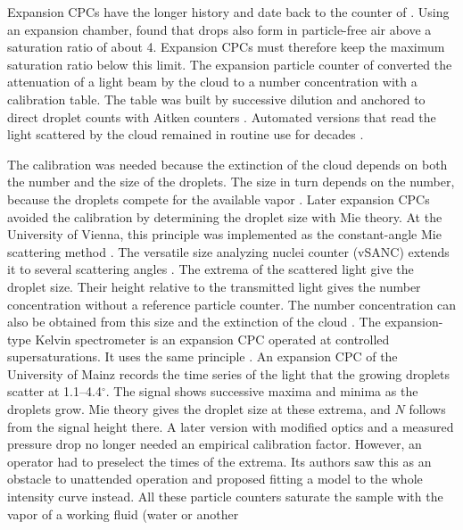 \documentclass[preprint,review,12pt,authoryear]{elsarticle}
\begin{document}
Expansion CPCs have the longer history and date back to the counter of \citet{aitken1889number}.
Using an expansion chamber, \citet{wilson1897condensation} found that drops also form in particle-free
air above a saturation ratio of about 4. Expansion CPCs must therefore keep the
maximum saturation ratio below this limit.
The expansion particle counter of \citet{nolan1946calibration} converted the attenuation of a light beam by
the cloud to a number concentration with a calibration table.
The table was built by successive dilution and anchored to direct droplet counts with Aitken counters
\citep{nolan1946calibration,pollak1959calibration}.
Automated versions that read the light scattered by the cloud remained in routine use for decades
\citep{skala1963new,mcmurry2000history}.

The calibration was needed because the extinction of the cloud depends on both the number and the size of
the droplets. The size in turn depends on the number, because the droplets compete for the available vapor
\citep{wagner1975interdependence,wagner1975experimental}.
Later expansion CPCs avoided the calibration by determining the droplet size with Mie theory. At the
University of Vienna, this principle was implemented as the constant-angle Mie scattering
method \citep{wagner1985cams}. The versatile size analyzing nuclei counter (vSANC) extends it to
several scattering angles \citep{pinterich2016vsanc}.
The extrema of the scattered light give the droplet size. Their height relative to the transmitted light
gives the number concentration without a reference particle counter.
The number concentration can also be obtained from this size and the extinction of the cloud
\citep{szymanski1990absolute}. The expansion-type Kelvin spectrometer is an expansion CPC operated at
controlled supersaturations. It uses the same principle \citep{hollander2002theoretical}.
An expansion CPC of the University of Mainz \citep{kurten2005automated} records the time series of the light
that the growing droplets scatter at 1.1--4.4$^\circ$. The signal shows successive maxima and
minima as the droplets grow. Mie theory gives the droplet size at these extrema, and $N$
follows from the signal height there.
A later version with modified optics and a measured pressure drop \citep{saghafifar2009modified} no
longer needed an empirical calibration factor. However, an operator had to preselect the times of the extrema.
Its authors saw this as an obstacle to unattended operation and proposed fitting a model to the
whole intensity curve instead.
All these particle counters saturate the sample with the vapor of a working fluid (water or another
\end{document}
